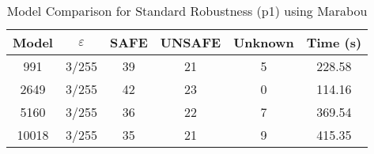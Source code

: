 \begin{table}[htbp]
\centering
\caption{Model Comparison for Standard Robustness (p1) using Marabou}
\label{tab:p1_marabou_model_comparison}
\begin{tabular}{|c|c|c|c|c|c|}
\hline
Model & $\varepsilon$ & SAFE & UNSAFE & Unknown & Time (s) \\ \hline
991 & 3/255 & 39 & 21 & 5 & 228.58 \\ \hline
2649 & 3/255 & 42 & 23 & 0 & 114.16 \\ \hline
5160 & 3/255 & 36 & 22 & 7 & 369.54 \\ \hline
10018 & 3/255 & 35 & 21 & 9 & 415.35 \\ \hline
\end{tabular}
\end{table}
